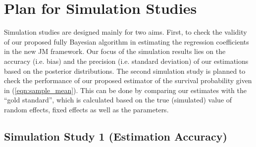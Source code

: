 







% 

\section{Plan for Simulation Studies} 
Simulation studies are designed mainly for two aims. First, to check the validity of our proposed fully Bayesian algorithm in estimating the regression coefficients in the new JM framework. Our focus of the simulation results lies on the accuracy (i.e. bias) and the precision (i.e. standard deviation) of our estimations based on the posterior distributions. The second simulation study is planned to check the performance of our proposed estimator of the survival probability given in (\ref{eqn:sample_mean}). This can be done by comparing our estimates with the ``gold standard'', which is calculated based on the true (simulated) value of random effects, fixed effects as well as the parameters.


\subsection{Simulation Study 1 (Estimation Accuracy) }


